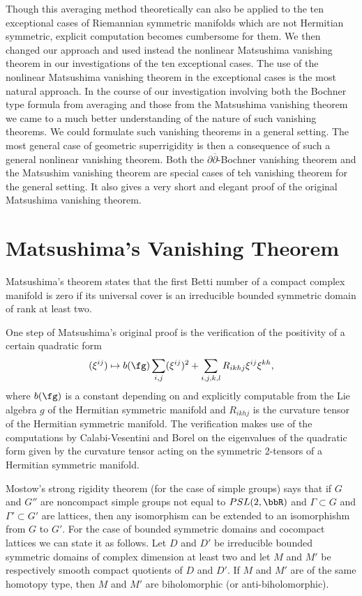 Though this averaging method theoretically can also be applied to the ten exceptional cases of Riemannian symmetric manifolds which are not Hermitian symmetric, explicit computation becomes cumbersome for them. We then changed our approach and used instead the nonlinear Matsushima vanishing theorem in our investigations of the ten exceptional cases. The use of the nonlinear Matsushima vanishing theorem in the exceptional cases is the most natural approach. In the course of our investigation involving both the Bochner type formula from averaging and those from the Matsushima vanishing theorem we came to a much better understanding of the nature of such vanishing theorems. We could formulate such vanishing theorems in a general setting. The most general case of geometric superrigidity is then a consequence of such a general nonlinear vanishing theorem. Both the $\partial \overline{\partial}$-Bochner vanishing theorem and the Matsushim vanishing theorem are special cases of teh vanishing theorem for the general setting. It also gives a very short and elegant proof of the original Matsushima vanishing theorem.

\section*{Matsushima's Vanishing Theorem}

Matsushima's theorem states that the first Betti number of a compact complex manifold is zero if its universal cover is an irreducible bounded symmetric domain of rank at least two.

One step of Matsushima's original proof is the verification of the positivity of a certain quadratic form
$$
(\xi^{ij}) \mapsto b(\fg) \sum\limits_{i,j}(\xi^{ij})^{2} + \sum\limits_{i,j,k,l} R_{ikhj}\xi^{ij}\xi^{kh},
$$
where $b(\fg)$ is a constant depending on and explicitly computable from  the Lie algebra $g$ of the Hermitian symmetric manifold and $R_{ikhj}$ is the curvature tensor of the Hermitian symmetric manifold. The verification makes use of the computations by Calabi-Vesentini and Borel on the eigenvalues of the quadratic form given by the curvature tensor acting on the symmetric 2-tensors of a Hermitian symmetric manifold.

Mostow's strong rigidity theorem (for the case of simple groups) says that if $G$ and $G''$ are noncompact simple groups not equal to $PSL\break (2, \bbR)$ and $\Gamma \subset G$ and $\Gamma' \subset G'$ are lattices, then any isomorphism can be extended to an isomorphishm from $G$ to $G'$. For the case of bounded symmetric domains and cocompact lattices we can state it as follows. Let $D$ and $D'$ be irreducible bounded symmetric domains of complex dimension at least two and let $M$ and $M'$ be respectively smooth compact quotients of $D$ and $D'$. If $M$ and $M'$ are of the same homotopy type, then $M$ and $M'$ are biholomorphic (or anti-biholomorphic).

